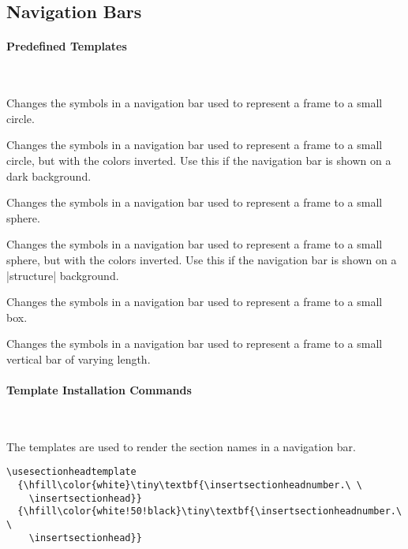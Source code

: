 \subsection{Navigation Bars}

\paragraph{Predefined Templates}\ 

\begin{command}{\beamertemplatecircleminiframe}
  Changes the symbols in a navigation bar used to represent
  a frame to a small circle.
\end{command}

\begin{command}{\beamertemplatecircleminiframeinverted}
  Changes the symbols in a navigation bar used to represent
  a frame to a small circle, but with the colors inverted. Use this if
  the navigation bar is shown on a dark background.
\end{command}

\begin{command}{\beamertemplatesphereminiframe}
  Changes the symbols in a navigation bar used to represent
  a frame to a small sphere.
\end{command}

\begin{command}{\beamertemplatesphereminiframeinverted}
  Changes the symbols in a navigation bar used to represent
  a frame to a small sphere, but with the colors inverted. Use this if
  the navigation bar is shown on a |structure| background.
\end{command}

\begin{command}{\beamertemplateboxminiframe}
  Changes the symbols in a navigation bar used to represent
  a frame to a small box.
\end{command}

\begin{command}{\beamertemplateticksminiframe}
  Changes the symbols in a navigation bar used to represent
  a frame to a small vertical bar of varying length.
\end{command}


\paragraph{Template Installation Commands}\ 

\begin{command}{\usesectionheadtemplate{}}
  The templates are used to render the section names in a navigation
  bar. 
  \example
\begin{verbatim}
\usesectionheadtemplate
  {\hfill\color{white}\tiny\textbf{\insertsectionheadnumber.\ \
    \insertsectionhead}}
  {\hfill\color{white!50!black}\tiny\textbf{\insertsectionheadnumber.\ \ 
    \insertsectionhead}}
\end{verbatim}
\end{command}
  

